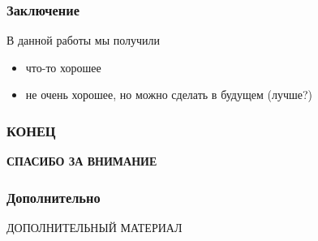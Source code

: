 \documentclass[utf8,9pt,mathserif,usepdftitle=false]{beamer}
\begin{document}
\begin{frame}
  \frametitle{Заключение}%
  В данной работы мы получили
  \begin{itemize}
  \item<1-> что-то хорошее
  \item<2-> не очень хорошее, но можно сделать в будущем (лучше?)
  \end{itemize}
\end{frame}

\begin{frame}
  \frametitle{КОНЕЦ}%
  \LARGE%
  \centering%
  \bfseries%
  СПАСИБО ЗА ВНИМАНИЕ%
\end{frame}

\begin{frame}
  \frametitle{Дополнительно}%
  \centering%
  ДОПОЛНИТЕЛЬНЫЙ МАТЕРИАЛ
\end{frame}
\end{document}
